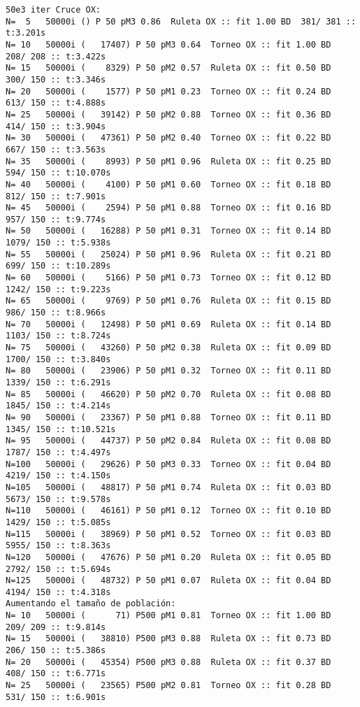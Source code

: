 \documentclass[10pt]{article}
\begin{document}
\begin{verbatim}
50e3 iter Cruce OX:
N=  5   50000i () P 50 pM3 0.86  Ruleta OX :: fit 1.00 BD  381/ 381 :: t:3.201s
N= 10   50000i (   17407) P 50 pM3 0.64  Torneo OX :: fit 1.00 BD  208/ 208 :: t:3.422s
N= 15   50000i (    8329) P 50 pM2 0.57  Ruleta OX :: fit 0.50 BD  300/ 150 :: t:3.346s
N= 20   50000i (    1577) P 50 pM1 0.23  Torneo OX :: fit 0.24 BD  613/ 150 :: t:4.888s
N= 25   50000i (   39142) P 50 pM2 0.88  Torneo OX :: fit 0.36 BD  414/ 150 :: t:3.904s
N= 30   50000i (   47361) P 50 pM2 0.40  Torneo OX :: fit 0.22 BD  667/ 150 :: t:3.563s
N= 35   50000i (    8993) P 50 pM1 0.96  Ruleta OX :: fit 0.25 BD  594/ 150 :: t:10.070s
N= 40   50000i (    4100) P 50 pM1 0.60  Torneo OX :: fit 0.18 BD  812/ 150 :: t:7.901s
N= 45   50000i (    2594) P 50 pM1 0.88  Torneo OX :: fit 0.16 BD  957/ 150 :: t:9.774s
N= 50   50000i (   16288) P 50 pM1 0.31  Torneo OX :: fit 0.14 BD 1079/ 150 :: t:5.938s
N= 55   50000i (   25024) P 50 pM1 0.96  Ruleta OX :: fit 0.21 BD  699/ 150 :: t:10.289s
N= 60   50000i (    5166) P 50 pM1 0.73  Torneo OX :: fit 0.12 BD 1242/ 150 :: t:9.223s
N= 65   50000i (    9769) P 50 pM1 0.76  Ruleta OX :: fit 0.15 BD  986/ 150 :: t:8.966s
N= 70   50000i (   12498) P 50 pM1 0.69  Ruleta OX :: fit 0.14 BD 1103/ 150 :: t:8.724s
N= 75   50000i (   43260) P 50 pM2 0.38  Ruleta OX :: fit 0.09 BD 1700/ 150 :: t:3.840s
N= 80   50000i (   23906) P 50 pM1 0.32  Torneo OX :: fit 0.11 BD 1339/ 150 :: t:6.291s
N= 85   50000i (   46620) P 50 pM2 0.70  Ruleta OX :: fit 0.08 BD 1845/ 150 :: t:4.214s
N= 90   50000i (   23367) P 50 pM1 0.88  Torneo OX :: fit 0.11 BD 1345/ 150 :: t:10.521s
N= 95   50000i (   44737) P 50 pM2 0.84  Ruleta OX :: fit 0.08 BD 1787/ 150 :: t:4.497s
N=100   50000i (   29626) P 50 pM3 0.33  Torneo OX :: fit 0.04 BD 4219/ 150 :: t:4.150s
N=105   50000i (   48817) P 50 pM1 0.74  Ruleta OX :: fit 0.03 BD 5673/ 150 :: t:9.578s
N=110   50000i (   46161) P 50 pM1 0.12  Torneo OX :: fit 0.10 BD 1429/ 150 :: t:5.085s
N=115   50000i (   38969) P 50 pM1 0.52  Torneo OX :: fit 0.03 BD 5955/ 150 :: t:8.363s
N=120   50000i (   47676) P 50 pM1 0.20  Ruleta OX :: fit 0.05 BD 2792/ 150 :: t:5.694s
N=125   50000i (   48732) P 50 pM1 0.07  Ruleta OX :: fit 0.04 BD 4194/ 150 :: t:4.318s
Aumentando el tamaño de población:
N= 10   50000i (      71) P500 pM1 0.81  Torneo OX :: fit 1.00 BD  209/ 209 :: t:9.814s
N= 15   50000i (   38810) P500 pM3 0.88  Ruleta OX :: fit 0.73 BD  206/ 150 :: t:5.386s
N= 20   50000i (   45354) P500 pM3 0.88  Ruleta OX :: fit 0.37 BD  408/ 150 :: t:6.771s
N= 25   50000i (   23565) P500 pM2 0.81  Torneo OX :: fit 0.28 BD  531/ 150 :: t:6.901s

\end{verbatim}
\end{document}
